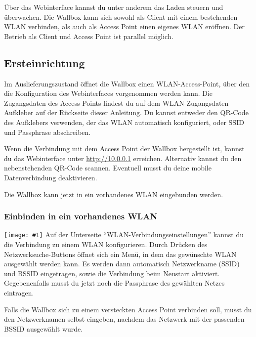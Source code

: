 \documentclass[a4paper,10pt]{article}
\newcommand{\gfx}[1]{\texttt{[image: \#1]}}
\begin{document}
\begin{multicols*}{2}
	Über das Webinterface kannst du unter anderem das Laden steuern und überwachen.
	Die Wallbox kann sich sowohl als Client mit einem bestehenden WLAN verbinden,
	als auch als Access Point einen eigenes WLAN eröffnen. Der Betrieb als Client
	und Access Point ist parallel möglich.

	\subsection{Ersteinrichtung}
	Im Auslieferungszustand öffnet die Wallbox einen WLAN-Access-Point, über den
	die Konfiguration des Webinterfaces vorgenommen werden kann.
	Die Zugangsdaten des Access Points findest du auf dem WLAN-Zugangsdaten-Aufkleber
	auf der Rückseite dieser Anleitung. Du kannst entweder den QR-Code des Aufklebers verwenden,
	der das WLAN automatisch konfiguriert, oder SSID und Passphrase abschreiben.

	\begin{minipage}{0.35\textwidth}
		Wenn die Verbindung mit dem Access Point der Wallbox hergestellt ist, kannst du das Webinterface
		unter \url{http://10.0.0.1} erreichen. Alternativ kannst du den nebenstehenden QR-Code scannen.
		Eventuell musst du deine mobile Datenverbindung deaktivieren.
	\end{minipage}\hfill
	\begin{minipage}{0.12\textwidth}
		\begin{flushright}
		\end{flushright}
	\end{minipage}

	Die Wallbox kann jetzt in ein vorhandenes WLAN eingebunden werden.
	\subsubsection{Einbinden in ein vorhandenes WLAN}
	\gfx{./img/resized/web_wifi_sta}
	Auf der Unterseite \enquote{WLAN-Verbindungseinstellungen} kannst du die Verbindung zu einem WLAN konfigurieren.
	Durch Drücken des Netzwerksuche-Buttons öffnet sich ein Menü, in dem das gewünschte WLAN ausgewählt werden kann.
	Es werden dann automatisch Netzwerkname (SSID) und BSSID eingetragen, sowie die Verbindung beim Neustart aktiviert.
	Gegebenenfalls musst du jetzt noch die Passphrase des gewählten Netzes eintragen.

	Falls die Wallbox sich zu einem versteckten Access Point verbinden soll, musst du den Netzwerknamen selbst eingeben,
	nachdem das Netzwerk mit der passenden BSSID ausgewählt wurde.


\end{multicols*}
\end{document}
